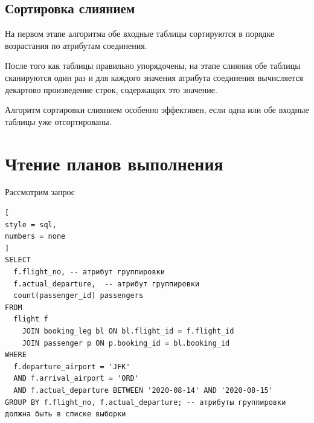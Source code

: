 \documentclass[%
	11pt,
	a4paper,
	utf8,
		]{article}
\begin{document}
\subsection{Сортировка слиянием}

На первом этапе алгоритма обе входные таблицы сортируются в порядке возрастания по атрибутам соединения.

После того как таблицы правильно упорядочены, на этапе слияния обе таблицы сканируются один раз и для каждого значения атрибута соединения вычисляется декартово произведение строк, содержащих это значение.

Алгоритм сортировки слиянием особенно эффективен, если одна или обе входные таблицы уже отсортированы.

\section{Чтение планов выполнения}

Рассмотрим запрос
\begin{lstlisting}[
style = sql,
numbers = none
]
SELECT
  f.flight_no, -- атрибут группировки
  f.actual_departure,  -- атрибут группировки
  count(passenger_id) passengers
FROM
  flight f
    JOIN booking_leg bl ON bl.flight_id = f.flight_id
    JOIN passenger p ON p.booking_id = bl.booking_id
WHERE
  f.departure_airport = 'JFK'
  AND f.arrival_airport = 'ORD'
  AND f.actual_departure BETWEEN '2020-08-14' AND '2020-08-15'
GROUP BY f.flight_no, f.actual_departure; -- атрибуты группировки должна быть в списке выборки
\end{lstlisting}
\end{document}
